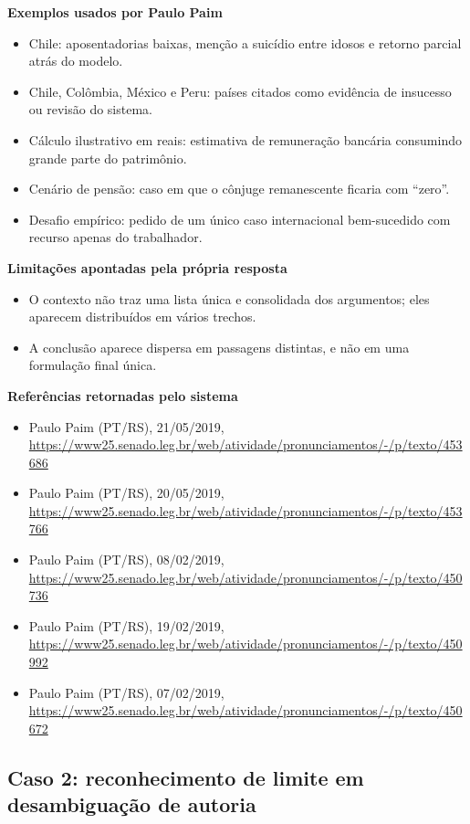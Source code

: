 \textbf{Exemplos usados por Paulo Paim}

\begin{itemize}
  \item Chile: aposentadorias baixas, menção a suicídio entre idosos e retorno parcial atrás do modelo.
  \item Chile, Colômbia, México e Peru: países citados como evidência de insucesso ou revisão do sistema.
  \item Cálculo ilustrativo em reais: estimativa de remuneração bancária consumindo grande parte do patrimônio.
  \item Cenário de pensão: caso em que o cônjuge remanescente ficaria com ``zero''.
  \item Desafio empírico: pedido de um único caso internacional bem-sucedido com recurso apenas do trabalhador.
\end{itemize}

\textbf{Limitações apontadas pela própria resposta}

\begin{itemize}
  \item O contexto não traz uma lista única e consolidada dos argumentos; eles aparecem distribuídos em vários trechos.
  \item A conclusão aparece dispersa em passagens distintas, e não em uma formulação final única.
\end{itemize}

\textbf{Referências retornadas pelo sistema}

\begin{itemize}
  \item Paulo Paim (PT/RS), 21/05/2019, \url{https://www25.senado.leg.br/web/atividade/pronunciamentos/-/p/texto/453686}
  \item Paulo Paim (PT/RS), 20/05/2019, \url{https://www25.senado.leg.br/web/atividade/pronunciamentos/-/p/texto/453766}
  \item Paulo Paim (PT/RS), 08/02/2019, \url{https://www25.senado.leg.br/web/atividade/pronunciamentos/-/p/texto/450736}
  \item Paulo Paim (PT/RS), 19/02/2019, \url{https://www25.senado.leg.br/web/atividade/pronunciamentos/-/p/texto/450992}
  \item Paulo Paim (PT/RS), 07/02/2019, \url{https://www25.senado.leg.br/web/atividade/pronunciamentos/-/p/texto/450672}
\end{itemize}

\subsection{Caso 2: reconhecimento de limite em desambiguação de autoria}

